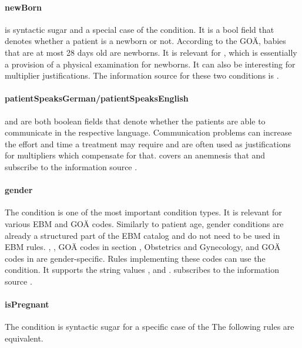 \paragraph{newBorn}
 is syntactic sugar and a special case of the  condition.
It is a bool field that denotes whether a patient is a newborn or not.
According to the GOÄ, babies that are at most 28 days old are newborns\addcite.
It is relevant for , which is essentially a provision of a physical examination for newborns.
It can also be interesting for multiplier justifications.
The information source for these two conditions is .

\paragraph{patientSpeaksGerman/patientSpeaksEnglish}
 and  are both boolean fields that denote whether the patients are able to communicate in the respective language.
Communication problems can increase the effort and time a treatment may require and are often used as justifications for multipliers which compensate for that.
 covers an anemnesis that 
 and  subscribe to the information source .

\paragraph{gender}
The  condition is one of the most important condition types.
It is relevant for various EBM and GOÄ codes.
Similarly to patient age, gender conditions are already a structured part of the EBM catalog and do not need to be used in EBM rules.
, ,  GOÄ codes in section , Obstetrics and Gynecology, and GOÄ codes in  are gender-specific.
Rules implementing these codes can use the  condition.
It supports the string values ,  and .
 subscribes to the information source .


\paragraph{isPregnant}
The  condition is syntactic sugar for a specific case of the 
The following rules are equivalent.

